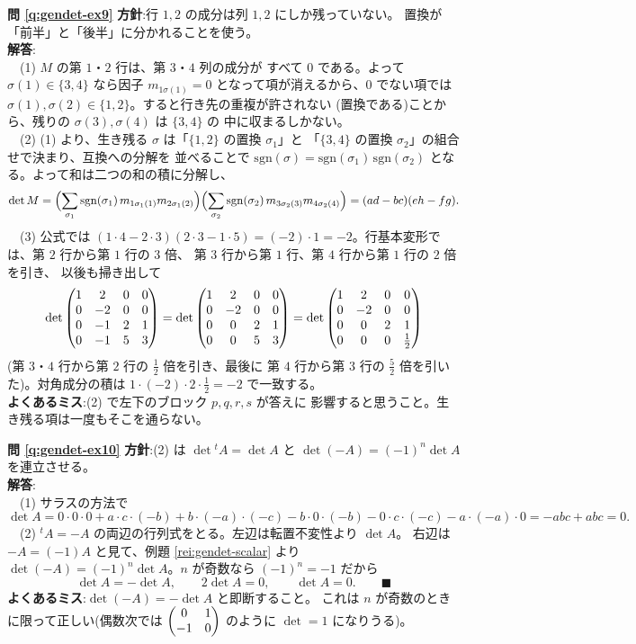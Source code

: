 \bigskip
\noindent\textbf{問 \ref{q:gendet-ex9}}\quad
\textbf{方針}:行 $1, 2$ の成分は列 $1, 2$ にしか残っていない。
置換が「前半」と「後半」に分かれることを使う。\\
\textbf{解答}:\\
　(1) $M$ の第 $1$・$2$ 行は、第 $3$・$4$ 列の成分が
すべて $0$ である。よって $\sigma(1) \in \{3, 4\}$ なら因子
$m_{1\sigma(1)} = 0$ となって項が消えるから、$0$ でない項では
$\sigma(1), \sigma(2) \in \{1, 2\}$。すると行き先の重複が許されない
(置換である)ことから、残りの $\sigma(3), \sigma(4)$ は $\{3, 4\}$ の
中に収まるしかない。\\
　(2) (1) より、生き残る $\sigma$ は「$\{1, 2\}$ の置換 $\sigma_1$」と
「$\{3, 4\}$ の置換 $\sigma_2$」の組合せで決まり、互換への分解を
並べることで $\mathrm{sgn}(\sigma) = \mathrm{sgn}(\sigma_1)\,
\mathrm{sgn}(\sigma_2)$ となる。よって和は二つの和の積に分解し、
\[
\det M = \Bigl(\sum_{\sigma_1} \mathrm{sgn}(\sigma_1)\,
m_{1\sigma_1(1)} m_{2\sigma_1(2)}\Bigr)
\Bigl(\sum_{\sigma_2} \mathrm{sgn}(\sigma_2)\,
m_{3\sigma_2(3)} m_{4\sigma_2(4)}\Bigr)
= (ad - bc)(eh - fg).
\]
　(3) 公式では $(1 \cdot 4 - 2 \cdot 3)(2 \cdot 3 - 1 \cdot 5)
= (-2) \cdot 1 = -2$。行基本変形では、第 $2$ 行から第 $1$ 行の $3$ 倍、
第 $3$ 行から第 $1$ 行、第 $4$ 行から第 $1$ 行の $2$ 倍を引き、
以後も掃き出して
\[
\det \begin{pmatrix}1 & 2 & 0 & 0 \\ 0 & -2 & 0 & 0 \\ 0 & -1 & 2 & 1 \\ 0 & -1 & 5 & 3\end{pmatrix}
= \det \begin{pmatrix}1 & 2 & 0 & 0 \\ 0 & -2 & 0 & 0 \\ 0 & 0 & 2 & 1 \\ 0 & 0 & 5 & 3\end{pmatrix}
= \det \begin{pmatrix}1 & 2 & 0 & 0 \\ 0 & -2 & 0 & 0 \\ 0 & 0 & 2 & 1 \\ 0 & 0 & 0 & \frac{1}{2}\end{pmatrix}
\]
(第 $3$・$4$ 行から第 $2$ 行の $\frac{1}{2}$ 倍を引き、最後に
第 $4$ 行から第 $3$ 行の $\frac{5}{2}$ 倍を引いた)。対角成分の積は
$1 \cdot (-2) \cdot 2 \cdot \frac{1}{2} = -2$ で一致する。\\
\textbf{よくあるミス}:(2) で左下のブロック $p, q, r, s$ が答えに
影響すると思うこと。生き残る項は一度もそこを通らない。

\bigskip
\noindent\textbf{問 \ref{q:gendet-ex10}}\quad
\textbf{方針}:(2) は $\det {}^t\!A = \det A$ と
$\det(-A) = (-1)^n \det A$ を連立させる。\\
\textbf{解答}:\\
　(1) サラスの方法で
\[
\det A = 0 \cdot 0 \cdot 0 + a \cdot c \cdot (-b) + b \cdot (-a) \cdot (-c)
- b \cdot 0 \cdot (-b) - 0 \cdot c \cdot (-c) - a \cdot (-a) \cdot 0
= -abc + abc = 0.
\]
　(2) ${}^t\!A = -A$ の両辺の行列式をとる。左辺は転置不変性より $\det A$。
右辺は $-A = (-1)A$ と見て、例題 \ref{rei:gendet-scalar} より
$\det(-A) = (-1)^n \det A$。$n$ が奇数なら $(-1)^n = -1$ だから
\[
\det A = -\det A, \qquad 2\det A = 0, \qquad \det A = 0. \qquad\blacksquare
\]
\textbf{よくあるミス}:$\det(-A) = -\det A$ と即断すること。
これは $n$ が奇数のときに限って正しい(偶数次では
$\begin{pmatrix}0 & 1 \\ -1 & 0\end{pmatrix}$ のように $\det = 1$ になりうる)。

